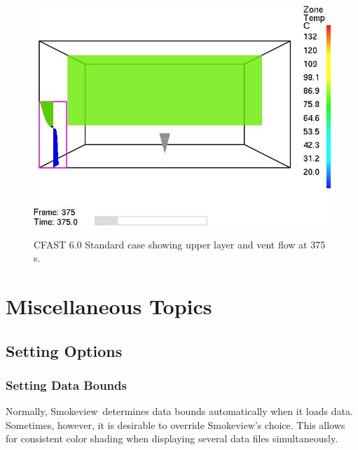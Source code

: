 \documentclass[11pt,twoside]{book}
\newcommand{\figoptions}{hbp}
\newcommand{\smokeview}{{Smokeview}}
\begin{document}
\begin{figure}[\figoptions]
\begin{center}
\includegraphics[height=3.5in]{figures/standard_0375}
\end{center}
\caption{CFAST 6.0 Standard case showing upper layer and vent flow at 375 s.}
\label{figcfast}%
\end{figure}

\part{Miscellaneous Topics}


\chapter{Setting Options}
\section{Setting Data Bounds}

Normally, \smokeview\ determines data bounds automatically
when it loads data. Sometimes, however, it is desirable to
override \smokeview's choice.  This allows for consistent
color shading when displaying several data files
simultaneously.
\end{document}
